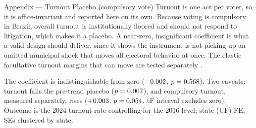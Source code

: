 
\begin{frame}{Appendix --- Turnout Placebo (compulsory vote)}
\hypertarget{app:turnoutplacebo}{}
\small
Turnout is one act per voter, so it is office-invariant and reported here on its own. Because voting is compulsory in Brazil, overall turnout is institutionally floored and should not respond to litigation, which makes it a placebo. A near-zero, insignificant coefficient is what a valid design should deliver, since it shows the instrument is not picking up an omitted municipal shock that moves all electoral behavior at once. The elastic facultative turnout margins that can move are tested separately \hyperlink{src:turnoutprofile}{}.
\smallskip
\begin{center}
\scriptsize
\resizebox{0.6\linewidth}{!}{}
\end{center}
\smallskip
\footnotesize The coefficient is indistinguishable from zero ($-0.002$, $p=0.568$). Two caveats: turnout fails the pre-trend placebo ($p=0.007$), and compulsory turnout, measured separately, rises ($+0.003$, $p=0.054$, tF interval excludes zero). Outcome is the 2024 turnout rate controlling for the 2016 level; state (UF) FE; SEs clustered by state.\hfill\hyperlink{src:voterballot}{}
\end{frame}
